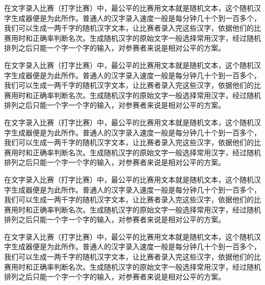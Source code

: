 \documentclass[12pt,hyperref,UTF8]{ctexbook}
\begin{document}
在文字录入比赛（打字比赛）中，最公平的比赛用文本就是随机文本，这个随机汉字生成器便是为此所作。普通人的汉字录入速度一般是每分钟几十个到一百多个，我们可以生成一两千字的随机汉字文本，让比赛者录入完这些汉字，依据他们的比赛用时和正确率判断名次。生成随机汉字的原始文字一般选择常用汉字，经过随机排列之后只能一个字一个字的输入，对参赛者来说是相对公平的方案。

在文字录入比赛（打字比赛）中，最公平的比赛用文本就是随机文本，这个随机汉字生成器便是为此所作。普通人的汉字录入速度一般是每分钟几十个到一百多个，我们可以生成一两千字的随机汉字文本，让比赛者录入完这些汉字，依据他们的比赛用时和正确率判断名次。生成随机汉字的原始文字一般选择常用汉字，经过随机排列之后只能一个字一个字的输入，对参赛者来说是相对公平的方案。

在文字录入比赛（打字比赛）中，最公平的比赛用文本就是随机文本，这个随机汉字生成器便是为此所作。普通人的汉字录入速度一般是每分钟几十个到一百多个，我们可以生成一两千字的随机汉字文本，让比赛者录入完这些汉字，依据他们的比赛用时和正确率判断名次。生成随机汉字的原始文字一般选择常用汉字，经过随机排列之后只能一个字一个字的输入，对参赛者来说是相对公平的方案。


在文字录入比赛（打字比赛）中，最公平的比赛用文本就是随机文本，这个随机汉字生成器便是为此所作。普通人的汉字录入速度一般是每分钟几十个到一百多个，我们可以生成一两千字的随机汉字文本，让比赛者录入完这些汉字，依据他们的比赛用时和正确率判断名次。生成随机汉字的原始文字一般选择常用汉字，经过随机排列之后只能一个字一个字的输入，对参赛者来说是相对公平的方案。

在文字录入比赛（打字比赛）中，最公平的比赛用文本就是随机文本，这个随机汉字生成器便是为此所作。普通人的汉字录入速度一般是每分钟几十个到一百多个，我们可以生成一两千字的随机汉字文本，让比赛者录入完这些汉字，依据他们的比赛用时和正确率判断名次。生成随机汉字的原始文字一般选择常用汉字，经过随机排列之后只能一个字一个字的输入，对参赛者来说是相对公平的方案。
\end{document}
